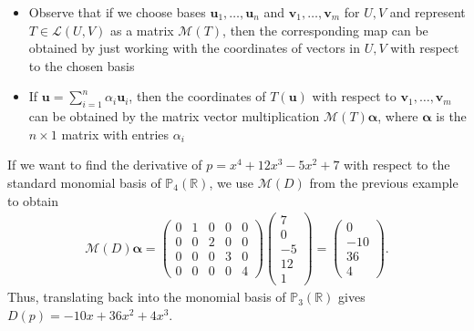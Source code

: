 \documentclass [aspectratio=169]{beamer}
\newcommand{\bu}{{\mathbf{u}}}
\newcommand{\bv}{{\mathbf{v}}}
\newcommand{\R}{{\mathbb{R}}}
\newcommand{\F}{{\mathbb{F}}}
\begin{document}
\begin{frame}
\begin{itemize}
\setlength\itemsep{1em}
\item Observe that if we choose bases $\bu_1, \ldots, \bu_n$ and $\bv_1, \ldots, \bv_m$ for $U,V$ and represent $T\in \mathcal{L}(U,V)$ as a matrix $\mathcal{M}(T)$, then the corresponding map can be obtained by just working with the coordinates of vectors in $U,V$ with respect to the chosen basis
\item  If $\bu = \sum_{i=1}^n \alpha_i \bu_i$, then the coordinates of $T(\bu)$ with respect to $\bv_1, \ldots, \bv_m$ can be obtained by the matrix vector multiplication $\mathcal{M}(T)\boldsymbol{\alpha}$, where $\boldsymbol{\alpha}$ is the $n\times 1$ matrix with entries $\alpha_i$
\end{itemize}
\end{frame}

\begin{frame}
\begin{example}
If we want to find the derivative of $p= x^4 +12x^3 -5x^2 +7$ with respect to the standard monomial basis of $\mathbb{P}_4(\R)$, we use $\mathcal{M}(D)$ from the previous example to obtain
\begin{align*}
    \mathcal{M}(D)\boldsymbol{\alpha} = \begin{pmatrix}
    0 & 1 & 0 & 0 & 0 \\
    0 & 0 & 2 & 0 & 0 \\
    0 & 0 & 0 & 3 & 0 \\
    0 & 0 & 0 & 0 & 4
     \end{pmatrix} \begin{pmatrix} 7\\ 0\\ -5\\12\\1
     \end{pmatrix} = \begin{pmatrix} 0 \\ -10\\ 36\\4
     \end{pmatrix}.
\end{align*}
Thus, translating back into the monomial basis of $\mathbb{P}_3(\R)$ gives $D(p) = -10x + 36x^2 +4x^3$.
\end{example}

\end{frame}
\end{document}
